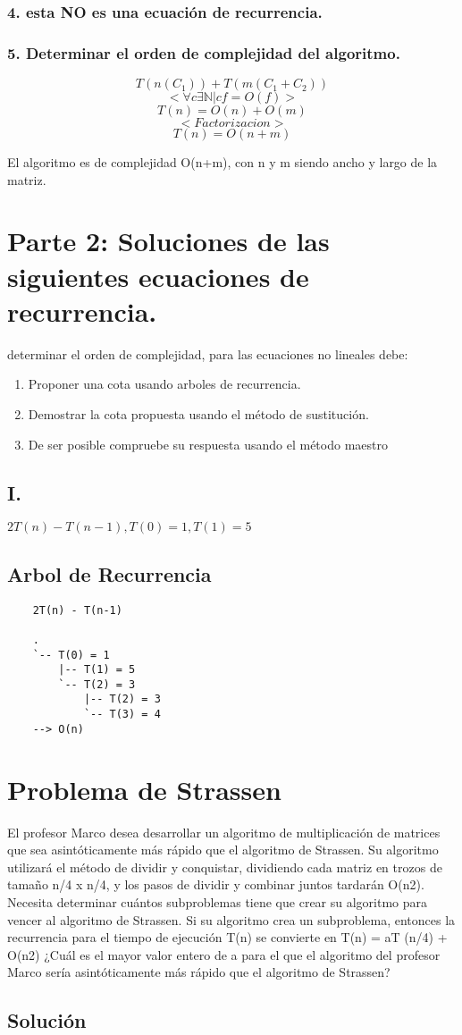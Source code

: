 \documentclass[12pt]{exam}
\begin{document}
\subsubsection*{4. esta NO es una ecuación de recurrencia.}
\subsubsection*{5. Determinar el orden de complejidad del algoritmo.}

$$ T(n(C_1)) + T(m(C_1+C_2)) $$
$$< \forall c \exists \mathbb{N} | cf = O(f) >$$
$$ T(n) = O(n) + O(m) $$
$$ < Factorizacion > $$ 
$$ T(n) = O(n+m) $$

El algoritmo es de complejidad O(n+m), con n y m siendo ancho y largo de la
matriz.


\section*{Parte 2: Soluciones de las siguientes ecuaciones de recurrencia.}
determinar el orden de complejidad, para las ecuaciones no lineales debe:
\begin{enumerate}
    \item Proponer una cota usando arboles de recurrencia.
    \item Demostrar la cota propuesta usando el método de sustitución.
    \item De ser posible compruebe su respuesta usando el método maestro
\end{enumerate}
\subsection*{I.}
$ 2T(n) - T(n-1), T(0)=1, T(1)=5 $
\subsection*{Arbol de Recurrencia}
\begin{verbatim}
    2T(n) - T(n-1)

    .
    `-- T(0) = 1
        |-- T(1) = 5
        `-- T(2) = 3
            |-- T(2) = 3 
            `-- T(3) = 4
    --> O(n)
\end{verbatim}

\section*{Problema de Strassen}

El profesor Marco desea desarrollar un algoritmo de multiplicación de matrices
que sea asintóticamente más rápido que el algoritmo de Strassen. Su algoritmo utilizará el
método de dividir y conquistar, dividiendo cada matriz en trozos de tamaño n/4 x n/4, y los
pasos de dividir y combinar juntos tardarán O(n2). Necesita determinar cuántos subproblemas
tiene que crear su algoritmo para vencer al algoritmo de Strassen. Si su algoritmo crea
un subproblema, entonces la recurrencia para el tiempo de ejecución T(n) se convierte en
T(n) = aT (n/4) + O(n2) ¿Cuál es el mayor valor entero de a para el que el algoritmo del
profesor Marco sería asintóticamente más rápido que el algoritmo de Strassen?

\subsection*{Solución}
\end{document}
